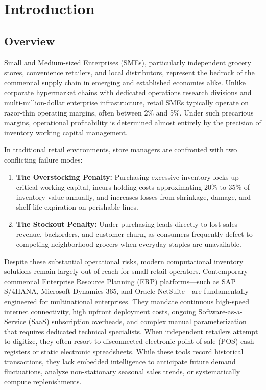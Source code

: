 \chapter{Introduction}
\section{Overview}
Small and Medium-sized Enterprises (SMEs), particularly independent grocery stores, convenience retailers, and local distributors, represent the bedrock of the commercial supply chain in emerging and established economies alike. Unlike corporate hypermarket chains with dedicated operations research divisions and multi-million-dollar enterprise infrastructure, retail SMEs typically operate on razor-thin operating margins, often between 2\% and 5\%. Under such precarious margins, operational profitability is determined almost entirely by the precision of inventory working capital management.

In traditional retail environments, store managers are confronted with two conflicting failure modes:
\begin{enumerate}
    \item \textbf{The Overstocking Penalty:} Purchasing excessive inventory locks up critical working capital, incurs holding costs approximating 20\% to 35\% of inventory value annually, and increases losses from shrinkage, damage, and shelf-life expiration on perishable lines.
    \item \textbf{The Stockout Penalty:} Under-purchasing leads directly to lost sales revenue, backorders, and customer churn, as consumers frequently defect to competing neighborhood grocers when everyday staples are unavailable.
\end{enumerate}

Despite these substantial operational risks, modern computational inventory solutions remain largely out of reach for small retail operators. Contemporary commercial Enterprise Resource Planning (ERP) platforms---such as SAP S/4HANA, Microsoft Dynamics 365, and Oracle NetSuite---are fundamentally engineered for multinational enterprises. They mandate continuous high-speed internet connectivity, high upfront deployment costs, ongoing Software-as-a-Service (SaaS) subscription overheads, and complex manual parameterization that requires dedicated technical specialists. When independent retailers attempt to digitize, they often resort to disconnected electronic point of sale (POS) cash registers or static electronic spreadsheets. While these tools record historical transactions, they lack embedded intelligence to anticipate future demand fluctuations, analyze non-stationary seasonal sales trends, or systematically compute replenishments.

